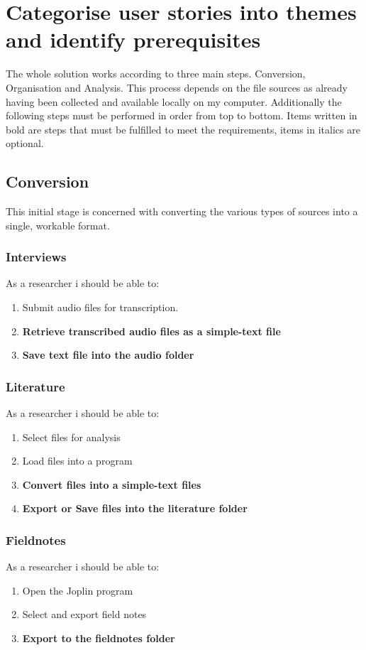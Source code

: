 \documentclass{article}
\begin{document}
\section{Categorise user stories into themes and identify prerequisites}
The whole solution works according to three main steps. Conversion, Organisation and Analysis. This process depends on the file sources as already having been collected and available locally on my computer. Additionally the following steps must be performed in order from top to bottom. Items written in bold are steps that must be fulfilled to meet the requirements, items in italics are optional.
\subsection{Conversion}
This initial stage is concerned with converting the various types of sources into a single, workable format.

\subsubsection{Interviews}

As a researcher i should be able to:
\begin{enumerate}
    \item Submit audio files for transcription.
    \item\textbf{Retrieve transcribed audio files as a simple-text file}
    \item\textbf{Save text file into the audio folder}
\end{enumerate}
\subsubsection{Literature}
As a researcher i should be able to:
\begin{enumerate}
    \item Select files for analysis
    \item Load files into a program
    \item\textbf{Convert files into a simple-text files}
    \item\textbf{Export or Save files into the literature folder}
\end{enumerate}

\subsubsection{Fieldnotes}
As a researcher i should be able to:
\begin{enumerate}
    \item Open the Joplin program
    \item Select and export field notes
    \item\textbf{Export to the fieldnotes folder}
\end{enumerate}
\end{document}
